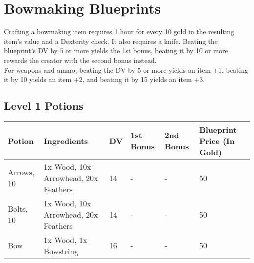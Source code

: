 \section{Bowmaking Blueprints}\label{sec:bowmakingBlueprints}
Crafting a bowmaking item requires 1 hour for every 10 gold in the resulting item's value and a Dexterity check.
It also requires a knife.
Beating the blueprint's DV by 5 or more yields the 1st bonus, beating it by 10 or more rewards the creator with the second bonus instead.\\
For weapons and ammo, beating the DV by 5 or more yields an item +1, beating it by 10 yields an item +2, and beating it by 15 yields an item +3.\\


\subsection{Level 1 Potions}
\begin{longtable}{l | p{2.5cm} | l | p{1.5cm} | p{1.5cm} | p{1cm} }
	Potion & Ingredients & DV & 1st Bonus & 2nd Bonus & Blueprint Price (In Gold)\\ \hline
	Arrows, 10 & 1x Wood, 10x Arrowhead, 20x Feathers & 14 & - & - & 50\\
	Bolts, 10 & 1x Wood, 10x Arrowhead, 20x Feathers & 14 & - & - & 50\\
	Bow & 1x Wood, 1x Bowstring & 16 & - & - & 50\\
\end{longtable}
